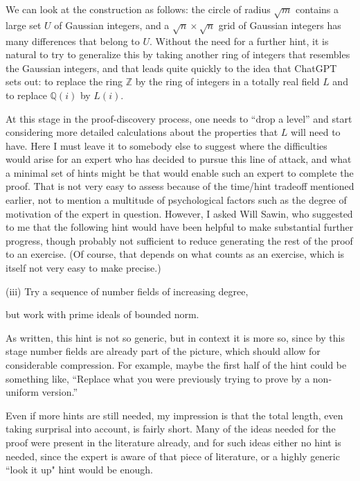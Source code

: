 \documentclass[11pt,reqno]{amsart}
\numberwithin{equation}{section}
\theoremstyle{definition}
\theoremstyle{remark}
\begin{document}
We can look at the construction as follows: the circle of radius $\sqrt m$ contains a large set $U$ of Gaussian integers, and a $\sqrt n\times\sqrt n$ grid of Gaussian integers has many differences that belong to $U$. Without the need for a further hint, it is natural to try to generalize this by taking another ring of integers that resembles the Gaussian integers, and that leads quite quickly to the idea that ChatGPT sets out: to replace the ring $\mathbb Z$ by the ring of integers in a totally real field $L$ and to replace $\mathbb Q(i)$ by $L(i)$. 

At this stage in the proof-discovery process, one needs to ``drop a level'' and start considering more detailed calculations about the properties that $L$ will need to have. Here I must leave it to somebody else to suggest where the difficulties would arise for an expert who has decided to pursue this line of attack, and what a minimal set of hints might be that would enable such an expert to complete the proof. That is not very easy to assess because of the time/hint tradeoff mentioned earlier, not to mention a multitude of psychological factors such as the degree of motivation of the expert in question. However, I asked Will Sawin, who suggested to me that the following hint would have been helpful to make substantial further progress, though probably not sufficient to reduce generating the rest of the proof to an exercise. (Of course, that depends on what counts as an exercise, which is itself not very easy to make precise.) 
\bigskip

\centerline{(iii) Try a sequence of number fields of increasing degree,} 
\centerline{but work with prime ideals of bounded norm.}
\bigskip

\noindent As written, this hint is not so generic, but in context it is more so, since by this stage number fields are already part of the picture, which should allow for considerable compression. For example, maybe the first half of the hint could be something like, ``Replace what you were previously trying to prove by a non-uniform version.'' 

Even if more hints are still needed, my impression is that the total length, even taking surprisal into account, is fairly short. Many of the ideas needed for the proof were present in the literature already, and for such ideas either no hint is needed, since the expert is aware of that piece of literature, or a highly generic ``look it up" hint would be enough. 
\end{document}
